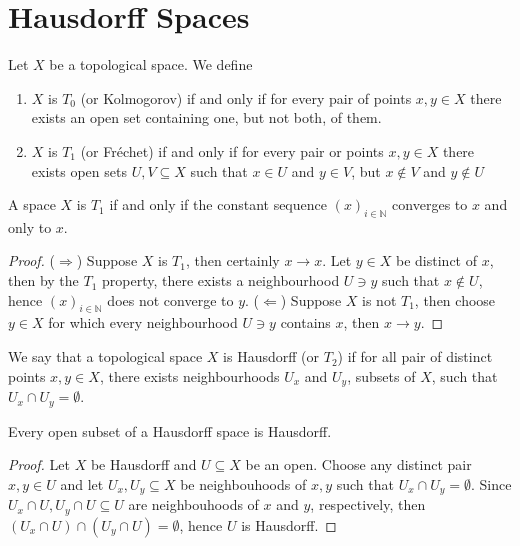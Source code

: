 \section{Hausdorff Spaces}

\begin{definition}
  Let \(X\) be a topological space. We define
  \begin{enumerate}[(1)]
    \item \(X\) is \(T_0\) (or Kolmogorov) if and only if for every pair of
      points \(x, y \in X\) there exists an open set containing one, but not
      both, of them.
    \item \(X\) is \(T_1\) (or Fréchet) if and only if for every pair or points
      \(x, y \in X\) there exists open sets \(U, V \subseteq X\) such that \(x
      \in U\) and \(y \in V\), but \(x \not\in V\) and \(y \not\in U\)
  \end{enumerate}
\end{definition}

\begin{proposition}
  A space \(X\) is \(T_1\) if and only if the constant sequence \((x)_{i \in
  \mathbb{N}}\) converges to \(x\) and only to \(x\).
\end{proposition}

\begin{proof}
  (\(\Rightarrow\)) Suppose \(X\) is \(T_1\), then certainly \(x \to x\). Let
  \(y \in X\) be distinct of \(x\), then by the \(T_1\) property, there exists a
  neighbourhood \(U \ni y\) such that \(x \not\in U\), hence \((x)_{i \in
  \mathbb{N}}\) does not converge to \(y\). (\(\Leftarrow\)) Suppose \(X\) is
  not \(T_1\), then choose \(y \in X\) for which every neighbourhood \(U \ni y\)
  contains \(x\), then \(x \to y\).
\end{proof}

\begin{definition}\label{def: Hausdorff space}
  We say that a topological space \(X\) is Hausdorff (or \(T_2\)) if for all
  pair of distinct points \(x, y \in X\), there exists neighbourhoods \(U_x\)
  and \(U_y\), subsets of \(X\), such that \(U_x \cap U_y = \emptyset\).
\end{definition}

\begin{corollary}
  Every open subset of a Hausdorff space is Hausdorff.
\end{corollary}

\begin{proof}
  Let \(X\) be Hausdorff and \(U \subseteq X\) be an open. Choose any
  distinct pair \(x, y \in U\) and let \(U_x, U_y \subseteq X\) be neighbouhoods
  of \(x, y\) such that \(U_x \cap U_y = \emptyset\). Since \(U_x \cap U, U_y
  \cap U \subseteq U\) are neighbouhoods of \(x\) and \(y\), respectively, then
  \((U_x \cap U) \cap (U_y \cap U) = \emptyset\), hence \(U\) is Hausdorff.
\end{proof}

